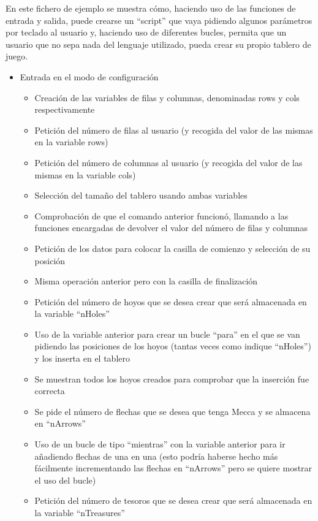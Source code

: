 \documentclass[a4paper,12pt,twoside,openright]{report}
\begin{document}
  En este fichero de ejemplo se muestra cómo, haciendo uso de las funciones de entrada y salida, puede crearse un ``script'' que 
  vaya pidiendo algunos parámetros por teclado al usuario y, haciendo uso de diferentes bucles, permita que un usuario que 
  no sepa nada del lenguaje utilizado, pueda crear su propio tablero de juego.
  
  \begin{itemize}
   \item Entrada en el modo de configuración
   \begin{itemize}
    \item Creación de las variables de filas y columnas, denominadas rows y cols respectivamente
    \item Petición del número de filas al usuario (y recogida del valor de las mismas en la variable rows)
    \item Petición del número de columnas al usuario (y recogida del valor de las mismas en la variable cols)
    \item Selección del tamaño del tablero usando ambas variables
    \item Comprobación de que el comando anterior funcionó, llamando a las funciones 
    encargadas de devolver el valor del número de filas y columnas
    \item Petición de los datos para colocar la casilla de comienzo y selección de su posición
    \item Misma operación anterior pero con la casilla de finalización
    \item Petición del número de hoyos que se desea crear que será almacenada en la variable ``nHoles''
    \item Uso de la variable anterior para crear un bucle ``para'' en el que se van pidiendo las posiciones de los hoyos (tantas veces 
    como indique ``nHoles'') y los inserta en el tablero
    \item Se muestran todos los hoyos creados para comprobar que la inserción fue correcta
    \item Se pide el número de flechas que se desea que tenga Mecca y se almacena en ``nArrows''
    \item Uso de un bucle de tipo ``mientras'' con la variable anterior para ir añadiendo flechas de una en una (esto 
    podría haberse hecho más fácilmente incrementando las flechas en ``nArrows'' pero se quiere mostrar el uso del bucle)
    \item Petición del número de tesoros que se desea crear que será almacenada en la variable ``nTreasures''

\end{itemize}
\end{itemize}
\end{document}
